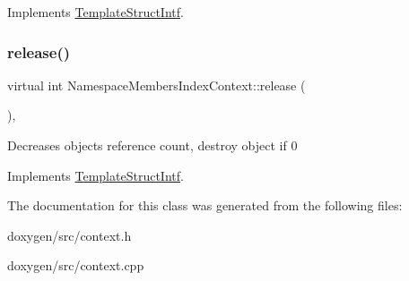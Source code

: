 Implements \mbox{\hyperlink{class_template_struct_intf_a3d610cb81b4adbb531ebed3aa3d09b51}{Template\+Struct\+Intf}}.

\mbox{\label{class_namespace_members_index_context_aa80fcd8abd99dbf8f067ec0dec4d52a8}} 
\subsubsection{\texorpdfstring{release()}{release()}}
{\footnotesize\ttfamily virtual int Namespace\+Members\+Index\+Context\+::release (\begin{DoxyParamCaption}{ }\end{DoxyParamCaption})\hspace{0.3cm}{\ttfamily [inline]}, {\ttfamily [virtual]}}

Decreases object\textquotesingle{}s reference count, destroy object if 0 

Implements \mbox{\hyperlink{class_template_struct_intf_a3dce7dd29d3f66a8080b40578e8a5045}{Template\+Struct\+Intf}}.



The documentation for this class was generated from the following files\+:\begin{DoxyCompactItemize}
\item 
doxygen/src/context.\+h\item 
doxygen/src/context.\+cpp\end{DoxyCompactItemize}
